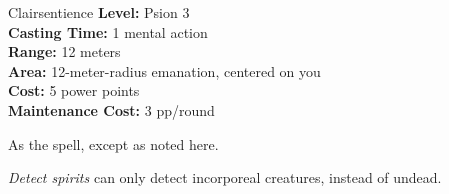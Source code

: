 {Clairsentience}
{
	\textbf{Level:}
	Psion 3\\
	\textbf{Casting Time:}
	1 mental action\\
	\textbf{Range:}
	12 meters\\
	\textbf{Area:}
	12-meter-radius emanation, centered on you\\
	\textbf{Cost:}
	5 power points\\
	\textbf{Maintenance Cost:}
	3 pp/round\\
}
{
	As the  spell, except as noted here.

	\emph{Detect spirits} can only detect incorporeal creatures, instead of undead.
}
